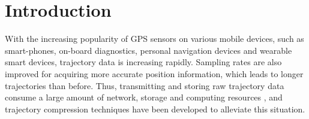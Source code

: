 \section{Introduction}
\label{sec-intro}



%
With the increasing popularity of GPS sensors on various mobile devices, such as smart-phones, on-board diagnostics, personal navigation devices and wearable smart devices, trajectory data is increasing rapidly. Sampling rates are also improved for acquiring more accurate position information, which leads to longer trajectories than before. Thus, transmitting and storing raw trajectory data consume a large amount of network, storage and computing resources \cite{Chen:Trajectory, Chen:Fast, Meratnia:Spatiotemporal, Keogh:online, Liu:BQS, Muckell:Compression,Cao:Spatio, Popa:Spatio, Schmid:Semantic,Richter:Semantic,Long:Direction,Nibali:Trajic}, and trajectory compression techniques \cite{Douglas:Peucker, Hershberger:Speeding, Meratnia:Spatiotemporal, Liu:BQS, Muckell:Compression, Chen:Trajectory, Chen:Fast, Keogh:online, Cao:Spatio, Shi:Survey, Richter:Semantic ,Long:Direction, Song:PRESS, Nibali:Trajic} have been developed to alleviate this situation.
%
%
%

